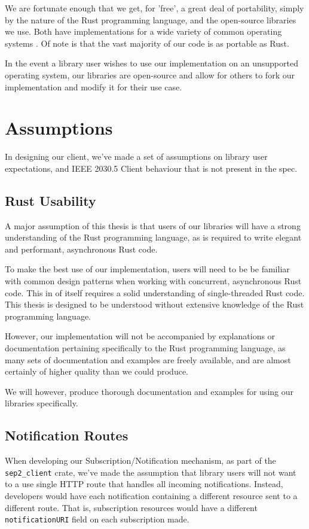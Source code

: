 We are fortunate enough that we get, for 'free', a great deal of portability, simply by the nature of the Rust programming language, and the open-source libraries we use. Both have implementations for a wide variety of common operating systems \cite{RustPlatforms} \cite{TokioDocs}. Of note is that the vast majority of our code is as portable as Rust.

In the event a library user wishes to use our implementation on an unsupported operating system, our libraries are open-source and allow for others to fork our implementation and modify it for their use case.
    
\section{Assumptions}
In designing our client, we've made a set of assumptions on library user expectations, and IEEE 2030.5 Client behaviour that is not present in the spec.

\subsection{Rust Usability}
A major assumption of this thesis is that users of our libraries will have a strong understanding of the Rust programming language, as is required to write elegant and performant, asynchronous Rust code.

To make the best use of our implementation, users will need to be be familiar with common design patterns when working with concurrent, asynchronous Rust code. This in of itself requires a solid understanding of single-threaded Rust code. This thesis is designed to be understood without extensive knowledge of the Rust programming language.

However, our implementation will not be accompanied by explanations or documentation pertaining specifically to the Rust programming language, as many sets of documentation and examples are freely available, and are almost certainly  of higher quality than we could produce. 

We will however, produce thorough documentation and examples for using our libraries specifically.

\subsection{Notification Routes}
When developing our Subscription/Notification mechanism, as part of the \texttt{sep2\_client} crate, we've made the assumption that library users will not want to a use single HTTP route that handles all incoming notifications. Instead, developers would have each notification containing a different resource sent to a different route. That is, subscription resources would have a different \texttt{notificationURI} field on each subscription made.

